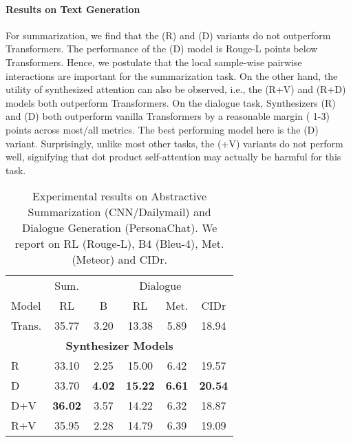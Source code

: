 \documentclass{article}
\begin{document}
\paragraph{Results on Text Generation} 
For summarization, we find that the (R) and (D) variants do not outperform Transformers. The performance of the (D) model is  Rouge-L points below Transformers. Hence, we postulate that the local sample-wise pairwise interactions are important for the summarization task. On the other hand, the utility of synthesized attention can also be observed, i.e., the (R+V) and (R+D) models both outperform Transformers. On the dialogue task, Synthesizers (R) and (D) both outperform vanilla Transformers by a reasonable margin ( 1-3) points across most/all metrics. The best performing model here is the (D) variant. Surprisingly, unlike most other tasks, the (+V) variants do not perform well, signifying that dot product self-attention may actually be harmful for this task.

\begin{table}[H]
\small
    \centering
    \begin{tabular}{l|c|cccc}
    \toprule
    & \multicolumn{1}{c}{Sum.} & \multicolumn{4}{c}{Dialogue} \\
        Model &	 RL & B & RL & Met. & CIDr \\
        \midrule
Trans. &35.77 & 3.20 & 13.38 & 5.89 & 18.94  \\
\midrule
\multicolumn{6}{c}{\textbf{Synthesizer Models}} \\ 
\midrule
R & 33.10 & 2.25 & 15.00 & 6.42 & 19.57  \\
D	&  33.70  & \textbf{4.02} & \textbf{15.22} & \textbf{6.61} & \textbf{20.54}  \\
D+V &  \textbf{36.02} & 3.57 &  14.22 & 6.32 & 18.87  \\ 
R+V &	 	35.95 & 2.28 & 14.79 & 6.39& 19.09  \\
\bottomrule
    \end{tabular}
    \caption{Experimental results on Abstractive Summarization (CNN/Dailymail) and Dialogue Generation (PersonaChat). We report on RL (Rouge-L), B4 (Bleu-4), Met. (Meteor) and CIDr. }
    \label{tab:gen}
\end{table}
\end{document}
